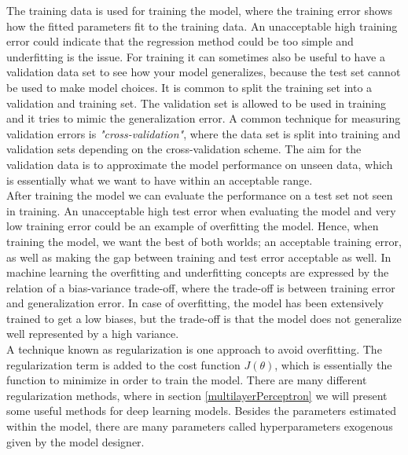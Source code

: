 The training data is used for training the model, where the training error shows how the fitted parameters fit to the training data. An unacceptable high training error could indicate that the regression method could be too simple and underfitting is the issue. For training it can sometimes also be useful to have a validation data set to see how your model generalizes, because the test set cannot be used to make model choices. It is common to split the training set into a validation and training set. The validation set is allowed to be used in training and it tries to mimic the generalization error. A common technique for measuring validation errors is \textsl{"cross-validation"}, where the data set is split into training and validation sets depending on the cross-validation scheme. The aim for the validation data is to approximate the model performance on unseen data, which is essentially what we want to have within an acceptable range.\\

After training the model we can evaluate the performance on a test set not seen in training. An unacceptable high test error when evaluating the model and very low training error could be an example of overfitting the model. Hence, when training the model, we want the best of both worlds; an acceptable training error, as well as making the gap between training and test error acceptable as well. In machine learning the overfitting and underfitting concepts are expressed by the relation of a bias-variance trade-off, where the trade-off is between training error and generalization error. In case of overfitting, the model has been extensively trained to get a low biases, but the trade-off is that the model does not generalize well represented by a high variance.\\

A technique known as regularization is one approach to avoid overfitting. The regularization term is added to the cost function $J(\theta)$, which is essentially the function to minimize in order to train the model. There are many different regularization methods, where in section \ref{multilayerPerceptron} we will present some useful methods for deep learning models. Besides the parameters estimated within the model, there are many parameters called hyperparameters exogenous given by the model designer.\\

